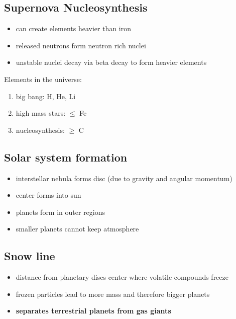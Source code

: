 \documentclass{article}
\theoremstyle{sltheorem}
\begin{document}
\subsection{Supernova Nucleosynthesis}
\begin{itemize}
	\item can create elements heavier than iron
	\item released neutrons form neutron rich nuclei
	\item unstable nuclei decay via beta decay to form heavier elements
\end{itemize}
Elements in the universe:
\begin{enumerate}
	\item big bang: H, He, Li
	\item high mass stars: $\leq$ Fe
	\item nucleosynthesis: $\geq$ C
\end{enumerate}
\subsection{Solar system formation}
\begin{itemize}
	\item interstellar nebula forms disc (due to gravity and angular momentum)
	\item center forms into sun
	\item planets form in outer regions
	\item smaller planets cannot keep atmosphere
\end{itemize}
\subsection{Snow line}
\begin{itemize}
	\item distance from planetary discs center where volatile compounds freeze
	\item frozen particles lead to more mass and therefore bigger planets
	\item \textbf{separates terrestrial planets from gas giants}
\end{itemize}
\end{document}
